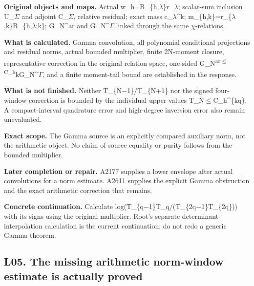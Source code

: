 \textbf{Original objects and maps.} Actual
w\_h=B\_\{h,\allowbreak{}\ensuremath{λ}\allowbreak{}\}r\_\allowbreak{}\ensuremath{λ}\allowbreak{};
scalar-sum inclusion U\_\allowbreak{}\ensuremath{Σ}\allowbreak{} and
adjoint C\_\allowbreak{}\ensuremath{Σ}\allowbreak{}, relative residual;
exact mass
c\_\allowbreak{}\ensuremath{λ}\allowbreak{}\textasciicircum{}k;
m\_\{h,k\}=r\_\{\allowbreak{}\ensuremath{λ}\allowbreak{},k\}B\_\{h,\allowbreak{}\ensuremath{λ}\allowbreak{};k\};
G\_N\^{}ar and
G\_N\textasciicircum{}\allowbreak{}\ensuremath{Γ}\allowbreak{} linked
through the same \allowbreak{}\ensuremath{χ}\allowbreak{}-relations.

\textbf{What is calculated.} Gamma convolution, all polynomial
conditional projections and residual norms, actual bounded multiplier,
finite 2N-moment closure, representative correction in the original
relation space, one-sided
G\_N\textsuperscript{ar\allowbreak{}\ensuremath{≤}\allowbreak{}C\_h}kG\_N\textasciicircum{}\allowbreak{}\ensuremath{Γ}\allowbreak{},
and a finite moment-tail bound are established in the response.

\textbf{What is not finished.} Neither
T\_\{N\allowbreak{}\ensuremath{−}\allowbreak{}1\}/T\_\{N+1\} nor the
signed four-window correction is bounded by the individual upper values
T\_N\allowbreak{}\ensuremath{≤}\allowbreak{}C\_h\textasciicircum{}\{kq\}.
A compact-interval quadrature error and high-degree inversion error also
remain unevaluated.

\textbf{Exact scope.} The Gamma source is an explicitly compared
auxiliary norm, not the arithmetic object. No claim of source equality
or purity follows from the bounded multiplier.

\textbf{Later completion or repair.} A2177 supplies a lower envelope
after actual convolutions for a norm estimate. A2611 supplies the
explicit Gamma obstruction and the exact arithmetic correction that
remains.

\textbf{Concrete continuation.} Calculate
log(T\_\{q\allowbreak{}\ensuremath{−}\allowbreak{}1\}T\_q/(T\_\{2q\allowbreak{}\ensuremath{−}\allowbreak{}1\}T\_\{2q\}))
with its signs using the original multiplier. Root's separate
determinant-interpolation calculation is the current continuation; do
not redo a generic Gamma theorem.

\subsection{L05. The missing arithmetic norm-window estimate is actually
proved}\label{TranscriptLedgerStage:l05.-the-missing-arithmetic-norm-window-estimate-is-actually-proved}

